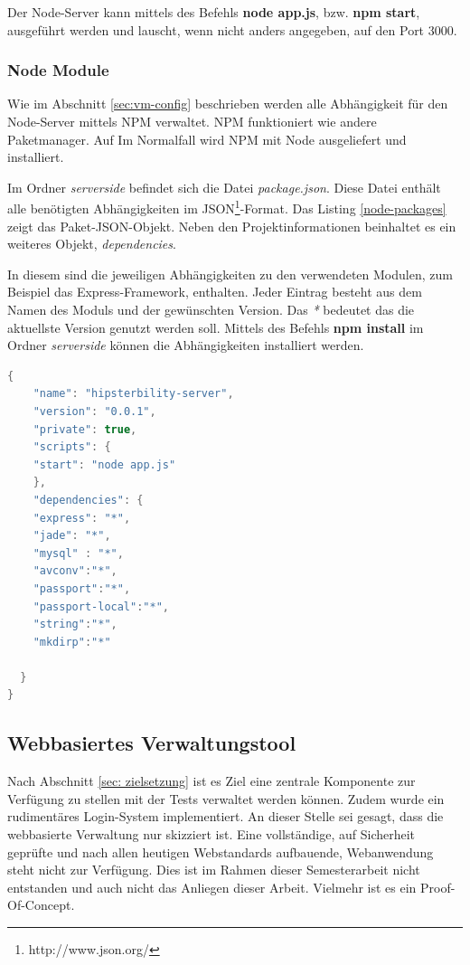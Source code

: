 Der Node-Server kann mittels des Befehls \textbf{node app.js}, bzw. \textbf{npm start}, ausgeführt werden und lauscht, wenn nicht anders angegeben, auf den Port 3000. 

\subsubsection{Node Module \label{sec:node-mudules}}

Wie im Abschnitt \ref{sec:vm-config} beschrieben werden alle Abhängigkeit für den Node-Server mittels NPM verwaltet. NPM funktioniert wie andere Paketmanager. Auf Im Normalfall wird NPM mit Node ausgeliefert und installiert. 

Im Ordner \textit{serverside} befindet sich die Datei \emph{package.json}. Diese Datei enthält alle benötigten Abhängigkeiten im JSON\footnote{http://www.json.org/}-Format. Das Listing \ref{node-packages} zeigt das Paket-JSON-Objekt. Neben den Projektinformationen beinhaltet es ein weiteres Objekt, \emph{dependencies}. 

In diesem sind die jeweiligen Abhängigkeiten zu den verwendeten Modulen, zum Beispiel das Express-Framework, enthalten. Jeder Eintrag besteht aus dem Namen des Moduls und der gewünschten Version. Das \emph{*} bedeutet das die aktuellste Version genutzt werden soll. Mittels des Befehls \textbf{npm install} im Ordner \textit{serverside} können die Abhängigkeiten installiert werden. 

\begin{lstlisting}[label=node-packages,language=Java, caption=Abhängigkeiten der Node-Anwendung]
{
    "name": "hipsterbility-server",
    "version": "0.0.1",
    "private": true,
    "scripts": {
    "start": "node app.js"
    },
    "dependencies": {
    "express": "*",
	"jade": "*",
	"mysql" : "*",
    "avconv":"*",
    "passport":"*",
    "passport-local":"*",
    "string":"*",
    "mkdirp":"*"

  }
}
\end{lstlisting}

\subsection{Webbasiertes Verwaltungstool}

Nach Abschnitt \ref{sec: zielsetzung} ist es Ziel eine zentrale Komponente zur Verfügung zu stellen mit der Tests verwaltet werden können. Zudem wurde ein rudimentäres Login-System implementiert. An dieser Stelle sei gesagt, dass die webbasierte Verwaltung nur skizziert ist. Eine vollständige, auf Sicherheit geprüfte und nach allen heutigen Webstandards aufbauende, Webanwendung steht nicht zur Verfügung. Dies ist im Rahmen dieser Semesterarbeit nicht entstanden und auch nicht das Anliegen dieser Arbeit. Vielmehr ist es ein Proof-Of-Concept. 

